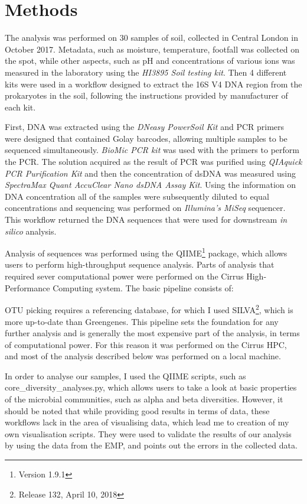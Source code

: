 \documentclass[12pt,twocolumn]{article} %
\begin{document}
\section{Methods}
The analysis was performed on 30 samples of soil, collected in Central London in October 2017. Metadata, such as moisture, temperature, footfall was collected on the spot, while other aspects, such as pH and concentrations of various ions was measured in the laboratory using the \textit{HI3895 Soil testing kit}. Then 4 different kits were used in a workflow designed to extract the 16S V4 DNA region from the prokaryotes in the soil, following the instructions provided by manufacturer of each kit.
\par
First, DNA was extracted using the \textit{DNeasy PowerSoil Kit} and PCR primers were designed that contained Golay barcodes, allowing multiple samples to be sequenced simultaneously. \textit{BioMic PCR kit} was used with the primers to perform the PCR. The solution acquired as the result of PCR was purified using \textit{QIAquick PCR Purification Kit} and then the concentration of dsDNA was measured using \textit{SpectraMax Quant AccuClear Nano dsDNA Assay Kit}. Using the information on DNA concentration all of the samples were subsequently diluted to equal concentrations and sequencing was performed on \textit{Illumina's MiSeq} sequencer. This workflow returned the DNA sequences that were used for downstream \textit{in silico} analysis.
\par
Analysis of sequences was performed using the QIIME\footnote{Version 1.9.1} package\cite{Caporaso2010,Kuczynski2012}, which allows users to perform high-throughput sequence analysis. Parts of analysis that required sever computational power were performed on the Cirrus High-Performance Computing system. The basic pipeline consists of:
\par 
OTU picking requires a referencing database, for which I used SILVA\cite{Quast2012}\footnote{Release 132, April 10, 2018}, which is more up-to-date than Greengenes\cite{McDonald2012}. This pipeline sets the foundation for any further analysis and is generally the most expensive part of the analysis, in terms of computational power. For this reason it was performed on the Cirrus HPC, and most of the analysis described below was performed on a local machine. 
\par
In order to analyse our samples, I used the QIIME scripts, such as core\_diversity\_analyses.py, which allows users to take a look at basic properties of the microbial communities, such as alpha and beta diversities. However, it should be noted that while providing good results in terms of data, these workflows lack in the area of visualising data, which lead me to creation of my own visualisation scripts\cite{Anonymous2018}. They were used to validate the results of our analysis by using the data from the EMP, and points out the errors in the collected data.
\end{document}
